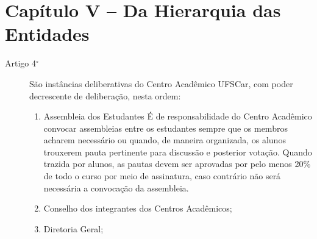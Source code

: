 \documentclass[12pt]{article}
\begin{document}
\section{Capítulo V -- Da Hierarquia das Entidades}
\begin{description}
    \item[Artigo 4$^\circ$] São instâncias deliberativas do Centro Acadêmico
        UFSCar, com poder decrescente de deliberação, nesta ordem:
        \begin{enumerate}[label=\alph*)]
            \item Assembleia dos Estudantes
                \subitem É de responsabilidade do Centro Acadêmico convocar
                assembleias entre os estudantes sempre que os membros acharem
                necessário ou quando, de maneira organizada, os alunos
                trouxerem pauta pertinente para discussão e posterior votação.
                Quando trazida por alunos, as pautas devem ser aprovadas por
                pelo menos 20\% de todo o curso por meio de assinatura, caso
                contrário não será necessária a convocação da assembleia.
            \item Conselho dos integrantes dos Centros Acadêmicos;
            \item Diretoria Geral;
        \end{enumerate}
    
\end{description}

\end{document}
